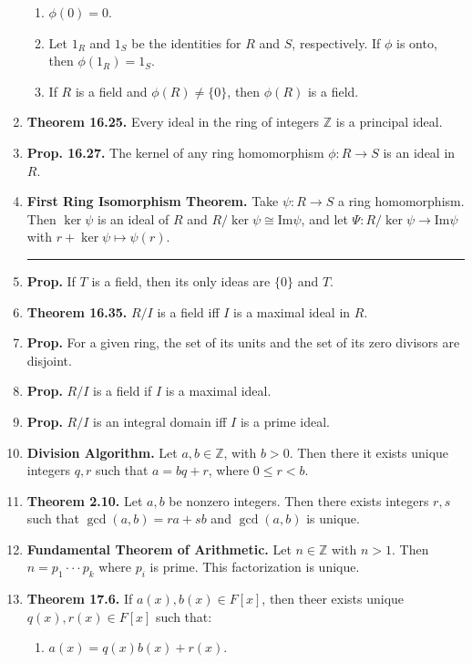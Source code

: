 \begin{enumerate}
\begin{enumerate}
            \item $\phi(0)=0$. 
            \item Let $1_R$ and $1_S$ be the identities for $R$ and $S$, respectively. If $\phi$ is onto, then $\phi(1_R) = 1_S$. 
            \item If $R$ is a field and $\phi(R) \neq \{0\}$, then $\phi(R)$ is a field. 
        \end{enumerate}
        \item \textbf{Theorem 16.25. } Every ideal in the ring of integers $\mathbb{Z}$ is a principal ideal. 
        \item \textbf{Prop. 16.27. } The kernel of any ring homomorphism $\phi: R \to S$ is an ideal in $R$. 
	\item \textbf{First Ring Isomorphism Theorem. } Take $\psi: R \to S$ a ring homomorphism. Then $\ker\psi$ is an ideal of $R$ and $R/\ker\psi \cong \textrm{Im}\psi$, and let $\Psi: R/\ker\psi \to \textrm{Im}\psi$ with $r + \ker\psi \mapsto \psi(r)$. 
	\begin{center}
		\hrule
	\end{center}
	\item \textbf{Prop. } If $T$ is a field, then its only ideas are $\{0\}$ and $T$. 
	\item \textbf{Theorem 16.35. } $R/I$ is a field iff $I$ is a maximal ideal in $R$. 
	\item \textbf{Prop. } For a given ring, the set of its units and the set of its zero divisors are disjoint. 
	\item \textbf{Prop. } $R/I$ is a field if $I$ is a maximal ideal. 
	\item \textbf{Prop. } $R/I$ is an integral domain iff $I$ is a prime ideal. 
	\item \textbf{Division Algorithm. } Let $a,b \in \mathbb{Z}$, with $b>0$. Then there it exists unique integers $q,r$ such that $a=bq+r$, where $0 \leq r < b$. 
	\item \textbf{Theorem 2.10. } Let $a,b$ be nonzero integers. Then there exists integers $r,s$ such that $\gcd(a,b)=ra+sb$ and $\gcd(a,b)$ is unique. 
	\item \textbf{Fundamental Theorem of Arithmetic. } Let $n \in \mathbb{Z}$ with $n>1$. Then $n=p_1 \cdot \cdot \cdot p_k$ where $p_i$ is prime. This factorization is unique. 
	\item \textbf{Theorem 17.6. } If $a(x),b(x) \in F[x]$, then theer exists unique $q(x),r(x) \in F[x]$ such that: 
	\begin{enumerate}
		\item $a(x) = q(x)b(x)+r(x)$. 

\end{enumerate}
\end{enumerate}
